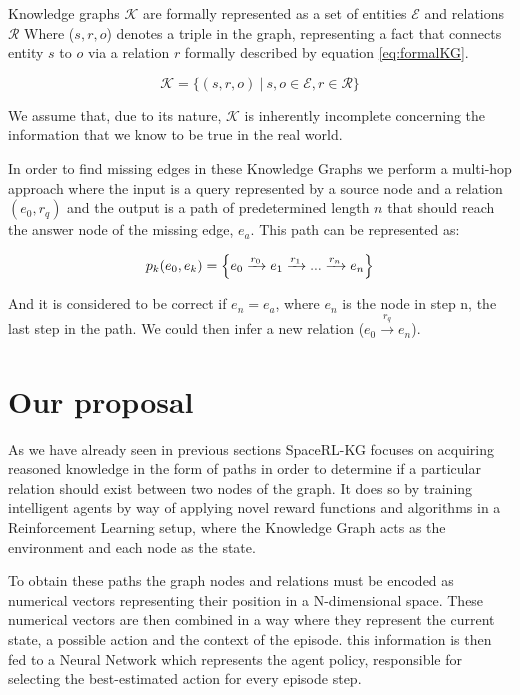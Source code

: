 
Knowledge graphs $\mathcal{K}$ are formally represented as a set of entities $\mathcal{E}$ and relations $ \mathcal{R}$ Where ($s, r, o$) denotes a triple in the graph, representing a fact that connects entity $s$ to $o$ via a relation $r$ formally described by equation \ref{eq:formalKG}. 

\begin{equation}
\label{eq:formalKG}
\mathcal{K} = \{ (s, r, o) ~|~ s, o \in \mathcal{E}, r \in \mathcal{R} \}
\end{equation}

We assume that, due to its nature, \( \mathcal{K} \) is inherently incomplete concerning the information that we know to be true in the real world.

In order to find missing edges in these Knowledge Graphs we perform a multi-hop approach where the input is a query represented by a source node and a relation $(e_0,r_q)$ and the output is a path of predetermined length $n$ that should reach the answer node of the missing edge, $e_a$. This path can be represented as:

\begin{equation}
\label{eq:formalPath}
p_k(e_0,e_k) =  \Bigl\{ e_0 \xrightarrow[]{r_0} e_1 \xrightarrow[]{r_1} ... \xrightarrow[]{r_n} e_n \Bigl\}
\end{equation}

And it is considered to be correct if $e_n = e_a$, where $e_n$ is the node in step n, the last step in the path. We could then infer a new relation ($e_0\xrightarrow[]{r_q}e_n$).

\section{Our proposal}\label{sec:spacerl-proposal}
As we have already seen in previous sections SpaceRL-KG focuses on acquiring reasoned knowledge in the form of paths in order to determine if a particular relation should exist between two nodes of the graph.
It does so by training intelligent agents by way of applying novel reward functions and algorithms in a Reinforcement Learning setup, where the Knowledge Graph acts as the environment and each node as the state.

To obtain these paths the graph nodes and relations must be encoded as numerical vectors representing their position in a N-dimensional space. 
These numerical vectors are then combined in a way where they represent the current state, a possible action and the context of the episode. this information is then fed to a Neural Network which represents the agent policy, responsible for selecting the best-estimated action for every episode step.

